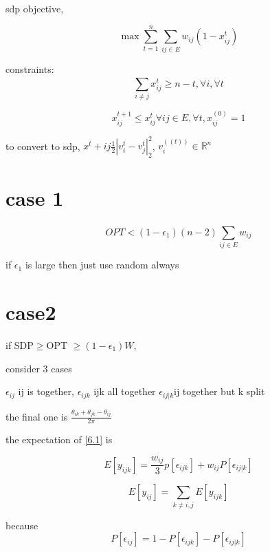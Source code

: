 \documentclass{article}
\theoremstyle{definition}
\newcommand{\abs}[1]{\left| #1 \right|}
\begin{document}
sdp objective,

\begin{equation}
    \max \sum_{t=1}^{n}\sum_{ij\in E}^{}w_{ij}(1-x^t_{ij})
\end{equation}

constraints:
\begin{equation}
    \sum_{i\neq j}^{}x_{ij}^t\geq n-t, \forall i, \forall t
\end{equation}


\begin{equation}
    x^{t+1}_{ij}\leq x^{t}_{ij} \forall ij\in E, \forall t, x_{ij}^{(0)}=1
\end{equation}


to convert to sdp, \(x^t+{ij}\frac{1}{2}\abs{v_i^t-v_j^t}_2^2\), \(v_i^{((t))}\in \mathbb R^n\)


\section{case 1}

\begin{equation}
    OPT<(1-\epsilon_1)(n-2)\sum_{ij\in E}^{}w_{ij}
\end{equation}


if \(\epsilon_1\) is large then just use random always

\section{case2} 
if SDP\(\geq \)OPT \(\geq (1-\epsilon_1)W\),

consider 3 cases

\(\epsilon_{ij}\) ij is together,
\(\epsilon_{ijk}\) ijk all together
\(\epsilon_{ij\vert k}\)ij together but k split

the final one is \(\frac{\theta_{ik}+\theta_{jk}-\theta_{ij}}{2\pi}\)


the expectation of \ref{6.1} is

\begin{equation}\label{6.2}
    E[y_{ijk}]=\frac{w_{ij}}{3}p[\epsilon_{ijk}]+w_{ij}P[\epsilon_{ij\vert k}]
\end{equation}

\begin{equation}\label{6.3}
    E[y_{ij}] = \sum_{k\neq i,j}^{}E[y_{ijk}]
\end{equation}


because 
\begin{equation}
    P[\epsilon_{ij}] = 1-P[\epsilon_{ijk}]-P[\epsilon_{ij\vert k }]
\end{equation}
\end{document}
